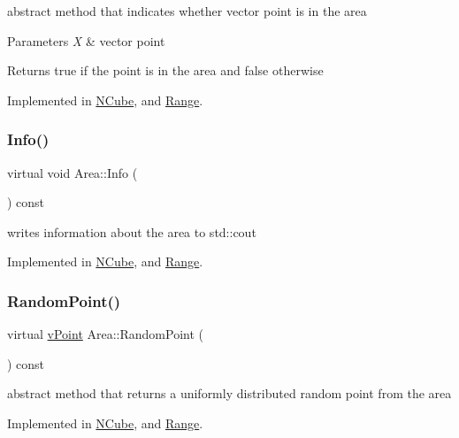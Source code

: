 abstract method that indicates whether vector point is in the area 
\begin{DoxyParams}{Parameters}
{\em X} & vector point \\
\hline
\end{DoxyParams}
\begin{DoxyReturn}{Returns}
true if the point is in the area and false otherwise 
\end{DoxyReturn}


Implemented in \hyperlink{class_n_cube_a042595f5e33795b2b454c2da3e9f13e0}{N\+Cube}, and \hyperlink{class_range_abaec0363220c4fbedaca148a4790bc9e}{Range}.

\mbox{\label{class_area_abc427001b3685b08cd836badffedfbbe}} 
\subsubsection{\texorpdfstring{Info()}{Info()}}
{\footnotesize\ttfamily virtual void Area\+::\+Info (\begin{DoxyParamCaption}{ }\end{DoxyParamCaption}) const\hspace{0.3cm}{\ttfamily [pure virtual]}}

writes information about the area to std\+::cout 

Implemented in \hyperlink{class_n_cube_aa7387e8654574bf3f4a0e32633516451}{N\+Cube}, and \hyperlink{class_range_adcbfaa8ea3d2e6da005573fd8146e952}{Range}.

\mbox{\label{class_area_a8a921495c0cca4095c8386f7b48ef086}} 
\subsubsection{\texorpdfstring{Random\+Point()}{RandomPoint()}}
{\footnotesize\ttfamily virtual \hyperlink{classv_point}{v\+Point} Area\+::\+Random\+Point (\begin{DoxyParamCaption}{ }\end{DoxyParamCaption}) const\hspace{0.3cm}{\ttfamily [pure virtual]}}

abstract method that returns a uniformly distributed random point from the area 

Implemented in \hyperlink{class_n_cube_a44e37293282724b0454c4542fa001c60}{N\+Cube}, and \hyperlink{class_range_a71795faae3f99507eb999e7df0c248da}{Range}.

